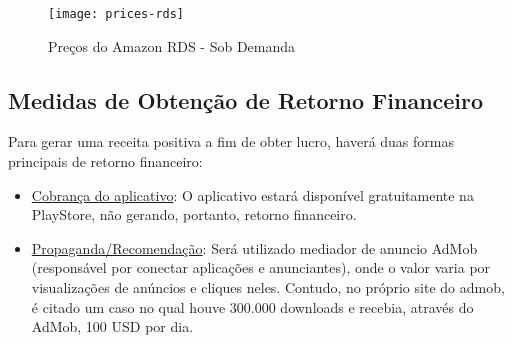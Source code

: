 \begin{figure}[h]
  \centering
  \caption{Preços do Amazon RDS - Sob Demanda \\ \cite{AmazonRDS}}
  \label{fig:prices-rds}
  \texttt{[image: prices-rds]}
\end{figure}	

\subsection{Medidas de Obtenção de Retorno Financeiro}

Para gerar uma receita positiva a fim de obter lucro, haverá duas formas principais de retorno financeiro:
\begin{itemize}
	\item \underline{Cobrança do aplicativo}: O aplicativo estará disponível gratuitamente na PlayStore, não gerando, portanto, retorno financeiro.
	\item \underline{Propaganda/Recomendação}: Será utilizado mediador de anuncio AdMob (responsável por conectar aplicações e anunciantes), onde o valor varia por visualizações de anúncios e cliques neles. Contudo, no próprio site do admob, é citado um caso no qual houve 300.000 downloads e recebia, através do AdMob, 100 USD por dia. \cite{GoogleAdMob}
\end{itemize}
